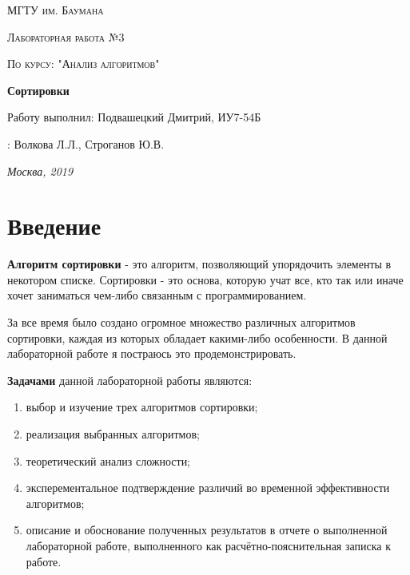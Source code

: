 \documentclass[12pt]{report}
\begin{document}
\begin{titlepage}
	\centering
	{\scshape\LARGE МГТУ им. Баумана \par}
	\vspace{3cm}
	{\scshape\Large Лабораторная работа №3\par}
	\vspace{0.5cm}	
	{\scshape\Large По курсу: "Анализ алгоритмов"\par}
	\vspace{1.5cm}
	{\huge\bfseries Сортировки\par}
	\vspace{2cm}
	\Large Работу выполнил: Подвашецкий Дмитрий, ИУ7-54Б\par
	\vspace{0.5cm}
	:  Волкова Л.Л., Строганов Ю.В.\par

	\vfill
	\large \textit {Москва, 2019} \par
\end{titlepage}

\tableofcontents

\newpage
\chapter*{Введение}

	\textbf{Алгоритм сортировки} - это алгоритм, позволяющий упорядочить элементы в некотором списке. Сортировки - это основа, которую учат все, кто так или иначе хочет заниматься чем-либо связанным с программированием. 

	За все время было создано огромное множество различных алгоритмов сортировки, каждая из которых обладает какими-либо особенности. В данной лабораторной работе я постраюсь это продемонстрировать.

	\textbf{Задачами} данной лабораторной работы являются:
\begin{enumerate}
	\item выбор и изучение трех алгоритмов сортировки;
	\item реализация выбранных алгоритмов;
	\item теоретический анализ сложности;
	\item эксперементальное подтверждение различий во временной эффективности алгоритмов;
	\item описание и обоснование полученных результатов в отчете о выполненной лабораторной
работе, выполненного как расчётно-пояснительная записка к работе.
\end{enumerate}
\end{document}
